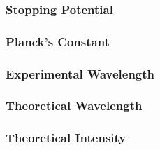 \documentclass[a4paper]{article}
\begin{document}
\subsubsection{Stopping Potential}
\label{cod:stoppingPotential}

\subsubsection{Planck's Constant}
\label{cod:planck}

\subsubsection{Experimental Wavelength}
\label{cod:expWavelength}

\subsubsection{Theoretical Wavelength}
\label{cod:theoWavelength}

\subsubsection{Theoretical Intensity}
\label{cod:theoIntensity}
\end{document}

